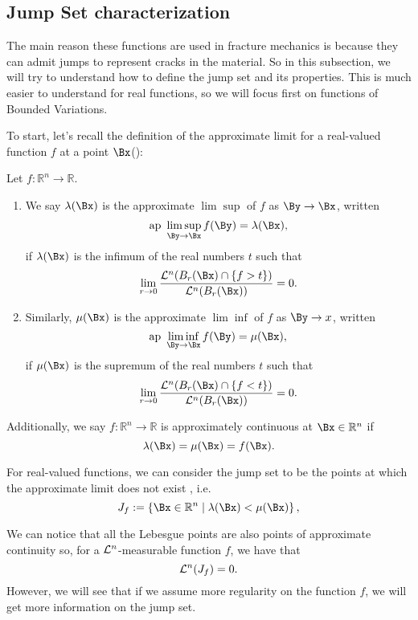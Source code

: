\subsection{Jump Set characterization}


The main reason these functions are used in fracture mechanics is because they can admit jumps to represent cracks in the material. So in this subsection, we will try to understand how to define the jump set and its properties. This is much easier to understand for real functions, so we will focus first on functions of Bounded Variations.

To start, let's recall the definition of the approximate limit for a real-valued function $f$ at a point $\Bx$(\cite[Definition 5.8]{evansGa}):


\begin{definition}
    Let $f: \mathbb{R}^n \rightarrow \mathbb{R}$.
   \begin{enumerate}
        \item  We say $\lambda(\Bx)$ is the approximate $\lim \sup$ of $f$ as $\By \rightarrow \Bx$, written $$\operatorname{ap\ }\limsup _{\By \rightarrow \Bx} f(\By)=\lambda(\Bx),$$
   if $\lambda(\Bx)$ is the infimum of the real numbers $t$ such that
   $$
   \lim _{r \rightarrow 0} \frac{\mathcal{L}^n(B_r(\Bx) \cap\{f>t\})}{\mathcal{L}^n(B_r(\Bx))}=0 .
   $$
   \item Similarly, $\mu(\Bx)$ is the approximate $\lim \inf$ of $f$ as $\By \rightarrow x$, written 
   $$\operatorname{ap\ } \liminf _{\By \rightarrow \Bx} f(\By)=\mu(\Bx),$$
   if $\mu(\Bx)$ is the supremum of the real numbers $t$ such that
   $$
   \lim _{r \rightarrow 0} \frac{\mathcal{L}^n(B_r(\Bx) \cap\{f<t\})}{\mathcal{L}^n(B_r(\Bx))}=0 .
   $$
    \end{enumerate}
   Additionally,  we say $f: \mathbb{R}^n \rightarrow \mathbb{R}$ is approximately continuous at $\Bx \in \mathbb{R}^n$ if
   $$
   \lambda(\Bx) =\mu(\Bx) =f(\Bx).
   $$
    \end{definition}
   For real-valued functions, we can consider the jump set to be the points at which the approximate limit does not exist \cite[Definition 5.9]{evansGa}, i.e. 
   $$
   J_f:=\left\{\Bx \in \mathbb{R}^n \mid \lambda(\Bx)<\mu(\Bx)\right\},
   $$

    We can notice that all the Lebesgue points are also points of approximate continuity so, for a ${\mathcal L}^n$-measurable function $f$, we have that $${\mathcal L}^n(J_f)=0.$$
    However, we will see that if we assume more regularity on the function $f$, we will get more information on the jump set.
   
